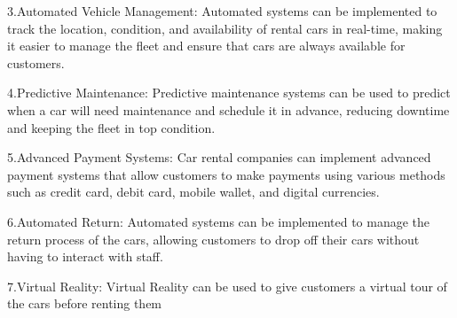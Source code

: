 3.Automated Vehicle Management: Automated systems can be implemented to track the location, condition, and availability of rental cars in real-time, making it easier to manage the fleet and ensure that cars are always available for customers.

4.Predictive Maintenance: Predictive maintenance systems can be used to predict when a car will need maintenance and schedule it in advance, reducing downtime and keeping the fleet in top condition.

5.Advanced Payment Systems: Car rental companies can implement advanced payment systems that allow customers to make payments using various methods such as credit card, debit card, mobile wallet, and digital currencies.

6.Automated Return: Automated systems can be implemented to manage the return process of the cars, allowing customers to drop off their cars without having to interact with staff.

7.Virtual Reality: Virtual Reality can be used to give customers a virtual tour of the cars before renting them

